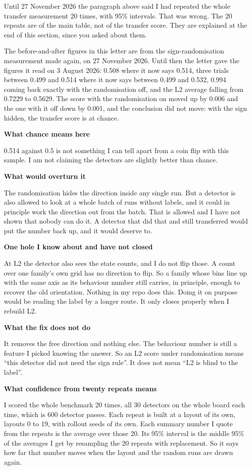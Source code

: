 \documentclass[11pt,a4paper]{article}
\newcommand{\subhead}[1]{%
  \par\vspace{0.9em}%
  {\sffamily\bfseries #1}%
  \par\vspace{0.15em}%
}
\begin{document}
Until 27 November 2026 the paragraph above said I had repeated the whole transfer
measurement 20 times, with 95\% intervals. That was wrong. The 20 repeats are of the
main table, not of the transfer score. They are explained at the end of this
section, since you asked about them.

The before-and-after figures in this letter are from the sign-randomisation
measurement made again, on 27 November 2026. Until then the letter gave the
figures it read on 3 August 2026: 0.508 where it now says 0.514, three trials
between 0.499 and 0.514 where it now says between 0.499 and 0.532, 0.994 coming
back exactly with the randomisation off, and the L2 average falling from 0.7229 to
0.5629. The score with the randomisation on moved up by 0.006 and the one with it
off down by 0.001, and the conclusion did not move: with the sign hidden, the
transfer score is at chance.

\subhead{What chance means here}
0.514 against 0.5 is not something I can tell apart from a coin flip with this
sample. I am not claiming the detectors are slightly better than chance.

\subhead{What would overturn it}
The randomisation hides the direction inside any single run. But a detector is also
allowed to look at a whole batch of runs without labels, and it could in principle
work the direction out from the batch. That is allowed and I have not shown that
nobody can do it. A detector that did that and still transferred would put the
number back up, and it would deserve to.

\subhead{One hole I know about and have not closed}
At L2 the detector also sees the state counts, and I do not flip those. A count
over one family's own grid has no direction to flip. So a family whose bins line up
with the same axis as its behaviour number still carries, in principle, enough to
recover the old orientation. Nothing in my repo does this. Doing it on purpose
would be reading the label by a longer route. It only closes properly when I
rebuild L2.

\subhead{What the fix does not do}
It removes the free direction and nothing else. The behaviour number is still a
feature I picked knowing the answer. So an L2 score under randomisation means
``this detector did not need the sign rule''. It does not mean ``L2 is blind to the
label''.

\subhead{What confidence from twenty repeats means}
\label{h:repeats}%
I scored the whole benchmark 20 times, all 30 detectors on the whole board each
time, which is 600 detector passes. Each repeat is built at a layout of its own,
layouts 0 to 19, with rollout seeds of its own. Each summary number I quote from the
repeats is the average over those 20. Its 95\% interval is the middle 95\% of the
averages I get by resampling the 20 repeats with replacement. So it says how far that
number moves when the layout and the random runs are drawn again.
\end{document}
